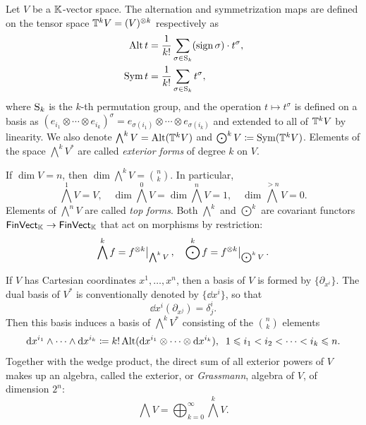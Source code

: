 \begin{defn}
    Let $V$ be a $\mathbb{K}$-vector space. The alternation and symmetrization maps are defined on the tensor space $\mathbb{T}^k V=(V)^{\otimes k}$ respectively as
    \begin{align}
        \operatorname{Alt} t&=\frac{1}{k!}\sum_{\sigma\in \mathrm{S}_k} (\operatorname{sign}\sigma)\cdot t^\sigma,\\
        \operatorname{Sym} t&=\frac{1}{k!}\sum_{\sigma\in \mathrm{S}_k} t^\sigma,\label{def sym operator}
    \end{align}
    where $\mathrm{S}_k$ is the $k$-th permutation group, and the operation $t\mapsto t^\sigma$ is defined on a basis as $(e_{i_1}\otimes\cdots\otimes e_{i_k})^\sigma=e_{\sigma(i_1)}\otimes\cdots\otimes e_{\sigma(i_k)}$ and extended to all of $\mathbb{T}^k V$ by linearity. We also denote $\bigwedge^k V=\operatorname{Alt}(\mathbb{T}^k V)$ and $\bigodot^k V\coloneqq \operatorname{Sym}(\mathbb{T}^k V)$. Elements of the space $\bigwedge^k V^\ast$ are called \emph{exterior forms} of degree $k$ on $V$. 
    
    If $\dim V=n$, then $\dim \bigwedge^k V=\binom{n}{k}$. In particular, 
    \[\bigwedge^1 V=V,\quad \dim \bigwedge^0 V=\dim \bigwedge^n V=1,\quad \dim \bigwedge^{>n} V=0.\]
    Elements of $\bigwedge^n V$ are called \emph{top forms}.
    Both $\bigwedge^k$ and $\bigodot^k$ are covariant functors $\mathsf{FinVect}_{\mathbb{K}}\to\mathsf{FinVect}_{\mathbb{K}}$ that act on morphisms by restriction: \[\bigwedge^k f=\restr{f^{\otimes k}}{\bigwedge^k V},\quad \bigodot^k f=\restr{f^{\otimes k}}{\bigodot^k V}.\]
\end{defn}

If $V$ has Cartesian coordinates $x^1,\ldots,x^n$, then a basis of $V$ is formed by $\{\partial_{x^i}\}$. The dual basis of $V^\ast$ is conventionally denoted by $\{\dd x^i\}$, so that
\[
    \dd x^i\left(\partial_{x^j}\right)=\delta^i_j.
\]
Then this basis induces a basis of $\bigwedge^k V^\ast$ consisting of the $\binom{n}{k}$ elements
\[
{\mathrm{d}} x^{i_1}\wedge \cdots \wedge {\mathrm{d}} x^{i_k}\coloneqq k!\operatorname{Alt}({\mathrm{d}} x^{i_1}\otimes\cdots\otimes {\mathrm{d}} x^{i_k}),\;\;1\leqslant i_1<i_2<\cdots<i_k\leqslant n.
\]
Together with the wedge product, the direct sum of all exterior powers of $V$ makes up an algebra, called the exterior, or \emph{Grassmann}, algebra of $V$, of dimension $2^n$:
\[\bigwedge V=\bigoplus_{k=0}^\infty \bigwedge^k V.\]



